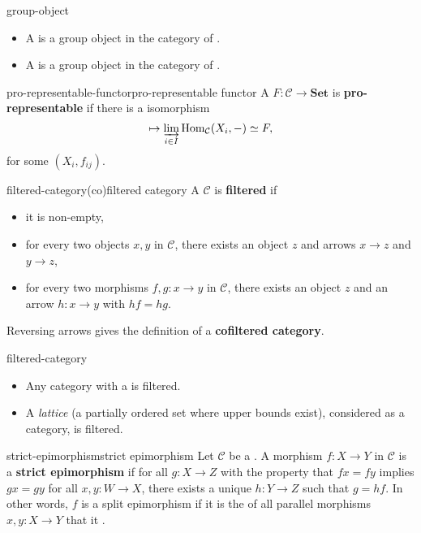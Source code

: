 \begin{example}{group-object}
    \begin{itemize}
        \item A  is a group object in the category of .
        \item A  is a group object in the category of .
    \end{itemize}
\end{example}

\begin{topic}{pro-representable-functor}{pro-representable functor}
    A  $F : \mathcal{C} \to \textbf{Set}$ is \textbf{pro-representable} if there is a  isomorphism
    \[ \mapsto \varinjlim_{i \in I} \text{Hom}_\mathcal{C}(X_i, -) \simeq F , \]
    for some  $(X_i, f_{ij})$.
\end{topic}

\begin{topic}{filtered-category}{(co)filtered category}
    A  $\mathcal{C}$ is \textbf{filtered} if
    \begin{itemize}
        \item it is non-empty,
        \item for every two objects $x, y$ in $\mathcal{C}$, there exists an object $z$ and arrows $x \to z$ and $y \to z$,
        \item for every two morphisms $f, g : x \to y$ in $\mathcal{C}$, there exists an object $z$ and an arrow $h : x \to y$ with $hf = hg$.
    \end{itemize}
    Reversing arrows gives the definition of a \textbf{cofiltered category}.
\end{topic}

\begin{example}{filtered-category}
    \begin{itemize}
        \item Any category with a  is filtered.
        \item A \textit{lattice} (a partially ordered set where upper bounds exist), considered as a category, is filtered.
    \end{itemize}
\end{example}

\begin{topic}{strict-epimorphism}{strict epimorphism}
    Let $\mathcal{C}$ be a . A morphism $f : X \to Y$ in $\mathcal{C}$ is a \textbf{strict epimorphism} if for all $g : X \to Z$ with the property that $fx = fy$ implies $gx = gy$ for all $x, y : W \to X$, there exists a unique $h : Y \to Z$ such that $g = hf$. In other words, $f$ is a split epimorphism if it is the  of all parallel morphisms $x, y : X \to Y$ that it .
\end{topic}

